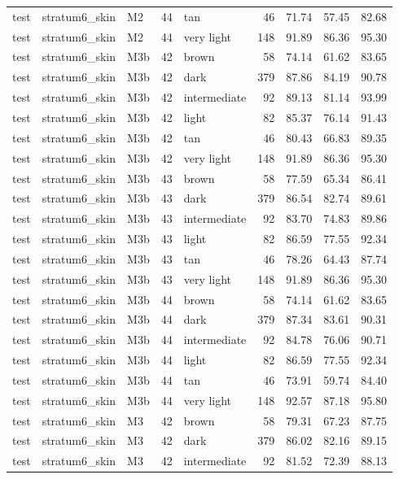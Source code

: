 \begin{tabular}{lllrlrrrr}
test & stratum6\_skin & M2 & 44 & tan & 46 & 71.74 & 57.45 & 82.68 \\
test & stratum6\_skin & M2 & 44 & very light & 148 & 91.89 & 86.36 & 95.30 \\
test & stratum6\_skin & M3b & 42 & brown & 58 & 74.14 & 61.62 & 83.65 \\
test & stratum6\_skin & M3b & 42 & dark & 379 & 87.86 & 84.19 & 90.78 \\
test & stratum6\_skin & M3b & 42 & intermediate & 92 & 89.13 & 81.14 & 93.99 \\
test & stratum6\_skin & M3b & 42 & light & 82 & 85.37 & 76.14 & 91.43 \\
test & stratum6\_skin & M3b & 42 & tan & 46 & 80.43 & 66.83 & 89.35 \\
test & stratum6\_skin & M3b & 42 & very light & 148 & 91.89 & 86.36 & 95.30 \\
test & stratum6\_skin & M3b & 43 & brown & 58 & 77.59 & 65.34 & 86.41 \\
test & stratum6\_skin & M3b & 43 & dark & 379 & 86.54 & 82.74 & 89.61 \\
test & stratum6\_skin & M3b & 43 & intermediate & 92 & 83.70 & 74.83 & 89.86 \\
test & stratum6\_skin & M3b & 43 & light & 82 & 86.59 & 77.55 & 92.34 \\
test & stratum6\_skin & M3b & 43 & tan & 46 & 78.26 & 64.43 & 87.74 \\
test & stratum6\_skin & M3b & 43 & very light & 148 & 91.89 & 86.36 & 95.30 \\
test & stratum6\_skin & M3b & 44 & brown & 58 & 74.14 & 61.62 & 83.65 \\
test & stratum6\_skin & M3b & 44 & dark & 379 & 87.34 & 83.61 & 90.31 \\
test & stratum6\_skin & M3b & 44 & intermediate & 92 & 84.78 & 76.06 & 90.71 \\
test & stratum6\_skin & M3b & 44 & light & 82 & 86.59 & 77.55 & 92.34 \\
test & stratum6\_skin & M3b & 44 & tan & 46 & 73.91 & 59.74 & 84.40 \\
test & stratum6\_skin & M3b & 44 & very light & 148 & 92.57 & 87.18 & 95.80 \\
test & stratum6\_skin & M3 & 42 & brown & 58 & 79.31 & 67.23 & 87.75 \\
test & stratum6\_skin & M3 & 42 & dark & 379 & 86.02 & 82.16 & 89.15 \\
test & stratum6\_skin & M3 & 42 & intermediate & 92 & 81.52 & 72.39 & 88.13 \\

\end{tabular}
